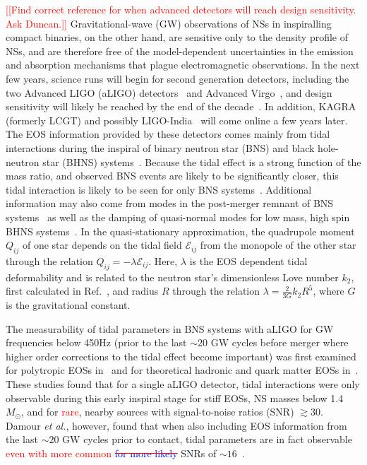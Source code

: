 \documentclass[twocolumn,prd,amssymb,aps,nofootinbib,showpacs,epsf]{revtex4}
\newcommand\ben[2]{\textcolor{red}{{#1}\sout{#2}}}
\newcommand\les[2]{\textcolor{blue}{{#1}\sout{#2}}}
\begin{document}
\ben{[[Find correct reference for when advanced detectors will reach design sensitivity. Ask Duncan.]]}{}
Gravitational-wave (GW) observations of NSs in inspiralling compact binaries, on the other hand, are sensitive only to the density profile of NSs, and are therefore free of the model-dependent uncertainties in the emission and absorption mechanisms that plague electromagnetic observations. In the next few years, science runs will begin for second generation detectors, including the two Advanced LIGO (aLIGO) detectors~\cite{Harry2010} and Advanced Virgo~\cite{Acernese2009}, and design sensitivity will likely be reached by the end of the decade~\cite{AasiAbadieAbbott2013}. In addition, \mbox{KAGRA}~\cite{Somiya2012} (formerly LCGT) and possibly LIGO-India~\cite{IyerSouradeepUnnikrishnan2011} will come online a few years later. The EOS information provided by these detectors comes mainly from tidal interactions during the inspiral of binary neutron star (BNS) and black hole-neutron star (BHNS) systems~\cite{FlanaganHinderer2008}. Because the tidal effect is a strong function of the mass ratio, and observed BNS events are likely to be significantly closer, this tidal interaction is likely to be seen for only BNS systems~\cite{PannaraleRezzollaOhmeRead2011}. Additional information may also come from modes in the post-merger remnant of BNS systems~\cite{StergioulasBausweinZagkouris2011, ClarkBausweinCadonati2014} as well as the damping of quasi-normal modes for low mass, high spin BHNS systems~\cite{LackeyKyutokuShibata2014}. In the quasi-stationary approximation, the quadrupole moment $Q_{ij}$ of one star depends on the tidal field $\mathcal{E}_{ij}$ from the monopole of the other star through the relation $Q_{ij} = -\lambda \mathcal{E}_{ij}$. Here, $\lambda$ is the EOS dependent tidal deformability and is related to the neutron star's dimensionless Love number $k_2$, first calculated in Ref.~\cite{Hinderer2008}, and radius $R$ through the relation $\lambda = \frac{2}{3G} k_2 R^5$, where $G$ is the gravitational constant.
 
The measurability of tidal parameters in BNS systems with aLIGO for GW frequencies below 450Hz (prior to the last $\sim 20$ GW cycles before merger where higher order corrections to the tidal effect become important) was first examined for polytropic EOSs in~\cite{FlanaganHinderer2008} and for theoretical hadronic and quark matter EOSs in~\cite{HindererLackeyLangRead2010}.  These studies found that for a single aLIGO detector, tidal interactions were only observable during this early inspiral stage for stiff EOSs, NS masses below 1.4~$M_\odot$, and for \ben{rare}{}, nearby sources with signal-to-noise ratios (SNR) $\gtrsim 30$. Damour {\it et al.}, however, found that when also including EOS information from the last $\sim 20$ GW cycles prior to contact, tidal parameters are in fact observable \ben{even with more common}{ \les{for more likely}{}} SNRs of $\sim 16$~\cite{DamourNagarVillain2012}. 
\end{document}
